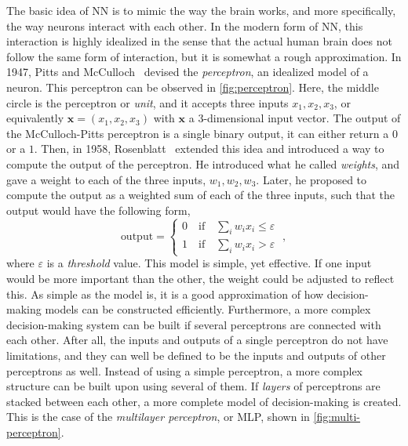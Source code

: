 The basic idea of NN is to mimic the way the brain works, and more specifically, the way 
neurons interact with each other. In the modern form of NN, this interaction is highly 
idealized in the sense that the actual human brain does not follow the same form of 
interaction, but it is somewhat a rough approximation. In 1947, Pitts and McCulloch~\cite{pittsHowWeKnow1947} devised the \emph{perceptron}, an idealized model of a neuron. This perceptron can be observed in \autoref{fig:perceptron}. Here, the middle circle is the perceptron or \emph{unit}, and it accepts three inputs \(x_1, x_2, x_3\), or equivalently \(\mathbf{x}=(x_1, x_2, x_3)\) with \(\mathbf{x}\) a \(3\)-dimensional input vector. The output of the McCulloch-Pitts perceptron is a single binary output, it can either return a \(0\) or a \(1\). Then, in 1958, Rosenblatt~\cite{rosenblattPerceptronProbabilisticModel1958} extended this idea and introduced a way to compute the output of the perceptron. He introduced what he called \emph{weights}, and gave a weight to each of the three inputs, \(w_1, w_2, w_3\). Later, he proposed to compute the output as a weighted sum of each of the three inputs, such that the output would have the following form,
\begin{equation}
    \text{output} = \begin{cases}
        0 \quad \text{if} \quad \sum_{i} w_i x_i \leq \varepsilon \\
        1 \quad \text{if} \quad \sum_{i} w_i x_i > \varepsilon
    \end{cases}
    \; ,
    \label{eq:output-perceptron}
\end{equation}
where \(\varepsilon\) is a \emph{threshold} value. This model is simple, yet effective. If 
one input would be more important than the other, the weight could be adjusted to reflect 
this. As simple as the model is, it is a good approximation of how decision-making models 
can be constructed efficiently. Furthermore, a more complex decision-making system can be built if several perceptrons are connected with each other. After all, the inputs and outputs of a single perceptron do not have limitations, and they can well be defined to be the inputs and outputs of other perceptrons as well. Instead of using a simple perceptron, a more complex structure can be built upon using several of them. If \emph{layers} of perceptrons are stacked between each other, a more complete model of decision-making is created. This is the case of the \emph{multilayer perceptron}, or MLP, shown in \autoref{fig:multi-perceptron}.

